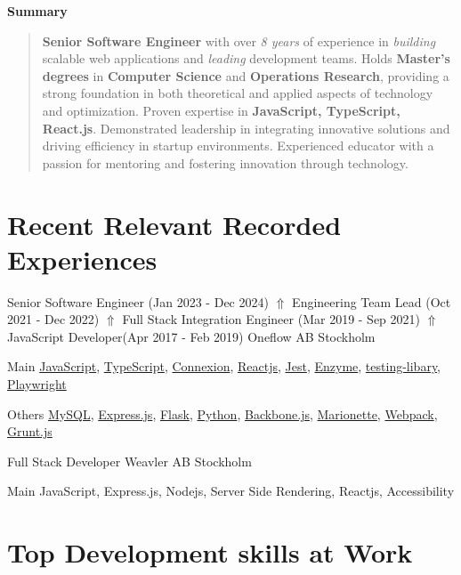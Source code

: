\documentclass[13.12pt,a4paper,sans,colorlinks,hyperindex,plainpages=false,bookmarksopen,bookmarksnumbered,pdfusetitle]{moderncv}
\newcommand{\cvsummary}[1]{
  \vspace{1em}
  \par\noindent\textbf{\large Summary}\par
  \vspace{0.5em}
  \begin{quote}
    \small #1
  \end{quote}
  \vspace{1em}
}
\newcommand{\badge}[2]{
  \colorbox{#1}{\hspace{0.1em} #2 \hspace{0.1em}}
}
\newcommand{\mainTech}[1]{
  \begin{flushleft}{\badge{flashyGreen}{Main} #1}\end{flushleft}
}
\newcommand{\techStackList}[1]{
  \begin{flushleft}{\badge{queenPink}{Others} #1}\end{flushleft}
}
\begin{document}
\cvsummary{
  \textbf{Senior Software Engineer} with over \textit{8 years} of experience in \textit{building} scalable web applications and \textit{leading} development teams.
  Holds \textbf{Master's degrees} in \textbf{Computer Science} and \textbf{Operations Research}, providing a strong foundation in both theoretical and applied aspects of technology and optimization.
  Proven expertise in \textbf{JavaScript, TypeScript, React.js}. Demonstrated leadership in integrating innovative solutions and driving efficiency in startup environments.
  Experienced educator with a passion for mentoring and fostering innovation through technology.
}

\section{Recent Relevant Recorded Experiences}
{Senior Software Engineer (Jan 2023 - Dec 2024)  \(\Uparrow\) Engineering Team Lead (Oct 2021 - Dec 2022) \(\Uparrow\) Full Stack Integration Engineer (Mar 2019 - Sep 2021)  \(\Uparrow\) JavaScript Developer(Apr 2017 - Feb 2019)}
{Oneflow AB}
{Stockholm \Large{}}{}
{
  \mainTech{\href{https://tc39.es/ecma262/}{JavaScript}, \href{https://www.typescriptlang.org/}{TypeScript}, \href{https://github.com/spec-first/connexion}{Connexion}, \href{https://react.dev/}{Reactjs}, \href{https://jestjs.io/}{Jest}, \href{https://enzymejs.github.io/enzyme/}{Enzyme}, \href{https://testing-library.com/}{testing-libary}, \href{https://playwright.dev/}{Playwright}}
  \techStackList{\href{https://www.mysql.com/}{MySQL}, \href{https://expressjs.com/}{Express.js}, \href{https://flask.palletsprojects.com/en/3.0.x/}{Flask}, \href{https://www.python.org/}{Python},  \href{https://backbonejs.org/}{Backbone.js}, \href{https://marionettejs.com/}{Marionette}, \href{https://webpack.js.org/}{Webpack}, \href{https://gruntjs.com/}{Grunt.js}}
}

\vspace{1em}

{Full Stack Developer}
{Weavler AB}
{Stockholm \Large{}}{}
{\mainTech{JavaScript, Express.js, Nodejs, Server Side Rendering, Reactjs, Accessibility}}

\section{Top Development skills at \textbf{Work}}
\end{document}
